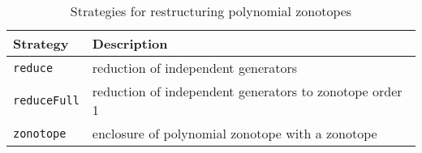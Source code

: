 \begin{table}
\centering
\caption{Strategies for restructuring polynomial zonotopes}
\label{tab:restructureStrategy}
\begin{tabular}{ l l }	
\toprule
\textbf{Strategy} & \textbf{Description} \\
\midrule
\texttt{reduce} & reduction of independent generators \\
\texttt{reduceFull} & reduction of independent generators to zonotope order 1 \\
\texttt{zonotope} & enclosure of polynomial zonotope with a zonotope \\
\bottomrule
\end{tabular}
\end{table}
